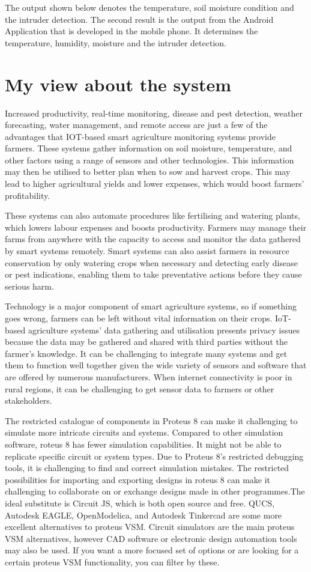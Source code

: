 \documentclass{wsdcr}
\begin{document}
The output shown below denotes the temperature, soil 
moisture condition and the intruder detection. The second 
result is the output from the Android Application that is 
developed in the mobile phone. It determines the 
temperature, humidity, moisture and the intruder detection.

\section{My view about the system}
Increased productivity, real-time monitoring, disease and pest detection, weather forecasting, water management, and remote access are just a few of the advantages that IOT-based smart agriculture monitoring systems provide farmers. These systems gather information on soil moisture, temperature, and other factors using a range of sensors and other technologies. This information may then be utilised to better plan when to sow and harvest crops. This may lead to higher agricultural yields and lower expenses, which would boost farmers' profitability.

These systems can also automate procedures like fertilising and watering plants, which lowers labour expenses and boosts productivity. Farmers may manage their farms from anywhere with the capacity to access and monitor the data gathered by smart systems remotely. Smart systems can also assist farmers in resource conservation by only watering crops when necessary and detecting early disease or pest indications, enabling them to take preventative actions before they cause serious harm.

Technology is a major component of smart agriculture systems, so if something goes wrong, farmers can be left without vital information on their crops. IoT-based agriculture systems' data gathering and utilisation presents privacy issues because the data may be gathered and shared with third parties without the farmer's knowledge. It can be challenging to integrate many systems and get them to function well together given the wide variety of sensors and software that are offered by numerous manufacturers. When internet connectivity is poor in rural regions, it can be challenging to get sensor data to farmers or other stakeholders.

The restricted catalogue of components in Proteus 8 can make it challenging to simulate more intricate circuits and systems. Compared to other simulation software, roteus 8 has fewer simulation capabilities. It might not be able to replicate specific circuit or system types. Due to Proteus 8's restricted debugging tools, it is challenging to find and correct simulation mistakes. The restricted possibilities for importing and exporting designs in roteus 8 can make it challenging to collaborate on or exchange designs made in other programmes.The ideal substitute is Circuit JS, which is both open source and free. QUCS, Autodesk EAGLE, OpenModelica, and Autodesk Tinkercad are some more excellent alternatives to proteus VSM.
Circuit simulators are the main proteus VSM alternatives, however CAD software or electronic design automation tools may also be used. If you want a more focused set of options or are looking for a certain proteus VSM functionality, you can filter by these.
\end{document}

